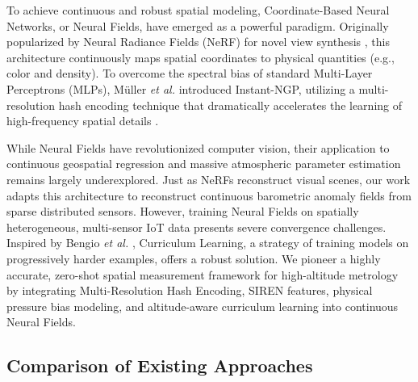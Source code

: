 


To achieve continuous and robust spatial modeling, Coordinate-Based Neural Networks, or Neural Fields, have emerged as a powerful paradigm. Originally popularized by Neural Radiance Fields (NeRF) for novel view synthesis \cite{mildenhall2020nerf}, this architecture continuously maps spatial coordinates to physical quantities (e.g., color and density). To overcome the spectral bias of standard Multi-Layer Perceptrons (MLPs), M\"{u}ller \textit{et al.} introduced Instant-NGP, utilizing a multi-resolution hash encoding technique that dramatically accelerates the learning of high-frequency spatial details \cite{muller2022instant}. 

While Neural Fields have revolutionized computer vision, their application to continuous geospatial regression and massive atmospheric parameter estimation remains largely underexplored. Just as NeRFs reconstruct visual scenes, our work adapts this architecture to reconstruct continuous barometric anomaly fields from sparse distributed sensors. However, training Neural Fields on spatially heterogeneous, multi-sensor IoT data presents severe convergence challenges. Inspired by Bengio \textit{et al.} \cite{bengio2009curriculum}, Curriculum Learning, a strategy of training models on progressively harder examples, offers a robust solution. We pioneer a highly accurate, zero-shot spatial measurement framework for high-altitude metrology by integrating Multi-Resolution Hash Encoding, SIREN features, physical pressure bias modeling, and altitude-aware curriculum learning into continuous Neural Fields.

\subsection{Comparison of Existing Approaches}

